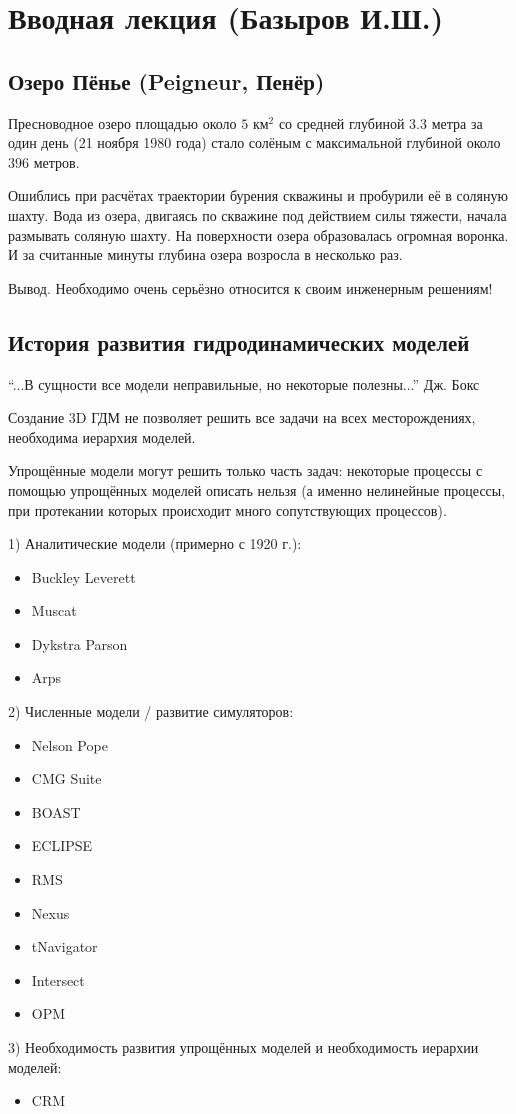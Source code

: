 \documentclass[main.tex]{subfiles}
\begin{document}

\section{Вводная лекция (Базыров И.Ш.)}

\subsection{Озеро Пёнье (Peigneur, Пенёр)}

Пресноводное озеро площадью около $5\text{ км}^2$ со средней глубиной $3.3$ метра за один день (21 ноября 1980 года) стало солёным с максимальной глубиной около $396$ метров.

Ошиблись при расчётах траектории бурения скважины и пробурили её в соляную шахту. 
Вода из озера, двигаясь по скважине под действием силы тяжести, начала размывать соляную шахту.
На поверхности озера образовалась огромная воронка. И за считанные минуты глубина озера возросла в несколько раз.

Вывод. Необходимо очень серьёзно относится к своим инженерным решениям!

\subsection{История развития гидродинамических моделей}

\enquote{...В сущности все модели неправильные, но некоторые полезны...} Дж. Бокс

Создание 3D ГДМ не позволяет решить все задачи на всех месторождениях, необходима иерархия моделей.

Упрощённые модели могут решить только часть задач: некоторые процессы с помощью упрощённых моделей описать нельзя (а именно нелинейные процессы, при протекании которых происходит много сопутствующих процессов).

1) Аналитические модели (примерно с 1920 г.):
\begin{itemize}
	\item Buckley Leverett
	\item Muscat
	\item Dykstra Parson
	\item Arps
\end{itemize}
2) Численные модели / развитие симуляторов:
\begin{itemize}
	\item Nelson Pope
	\item CMG Suite
	\item BOAST
	\item ECLIPSE
	\item RMS
	\item Nexus
	\item tNavigator
	\item Intersect
	\item OPM
\end{itemize}
3) Необходимость развития упрощённых моделей и необходимость иерархии моделей:
\begin{itemize}
	\item CRM
\end{itemize}
\end{document}
